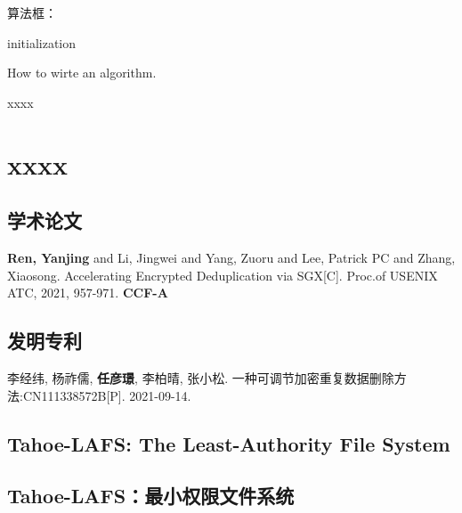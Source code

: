 \documentclass[promaster]{thesis-uestc}
\begin{document}
算法框：

\begin{algorithm}[H]
    initialization\;
    \caption{How to wirte an algorithm.}
\end{algorithm}

\thesisacknowledgement

xxxx %


\thesisappendix
\chapter{xxxx} %

\begin{thesistheaccomplish}
    \section{学术论文}
     \textbf{Ren, Yanjing} and Li, Jingwei and Yang, Zuoru and Lee, Patrick PC and Zhang, Xiaosong. Accelerating Encrypted Deduplication via SGX[C]. Proc.of USENIX ATC, 2021, 957-971. \textbf{CCF-A}
    \section{发明专利}
     李经纬, 杨祚儒, \textbf{任彦璟}, 李柏晴, 张小松. 一种可调节加密重复数据删除方法:CN111338572B[P]. 2021-09-14.
\end{thesistheaccomplish}

\thesistranslationoriginal
\section{Tahoe-LAFS: The Least-Authority File System}

\thesistranslationchinese
\section{Tahoe-LAFS：最小权限文件系统}
\end{document}
